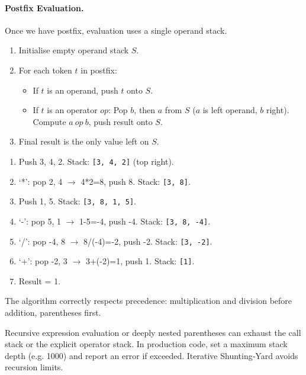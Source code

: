 \documentclass[11pt]{article}
\begin{document}
\paragraph{Postfix Evaluation.}
Once we have postfix, evaluation uses a single operand stack.

\begin{methode}
\begin{enumerate}
\item Initialise empty operand stack $S$.
\item For each token $t$ in postfix:
  \begin{itemize}
  \item If $t$ is an operand, push $t$ onto $S$.
  \item If $t$ is an operator $op$:
        Pop $b$, then $a$ from $S$ ($a$ is left operand, $b$ right).
        Compute $a\ op\ b$, push result onto $S$.
  \end{itemize}
\item Final result is the only value left on $S$.
\end{enumerate}
\end{methode}

\begin{exoresolu}
\begin{enumerate}
\item Push 3, 4, 2. Stack: \texttt{[3, 4, 2]} (top right).
\item `*': pop 2, 4 $\to$ 4*2=8, push 8. Stack: \texttt{[3, 8]}.
\item Push 1, 5. Stack: \texttt{[3, 8, 1, 5]}.
\item `-': pop 5, 1 $\to$ 1-5=-4, push -4. Stack: \texttt{[3, 8, -4]}.
\item `/': pop -4, 8 $\to$ 8/(-4)=-2, push -2. Stack: \texttt{[3, -2]}.
\item `+': pop -2, 3 $\to$ 3+(-2)=1, push 1. Stack: \texttt{[1]}.
\item Result = 1.
\end{enumerate}
\tcblower
The algorithm correctly respects precedence: multiplication and division before addition, parentheses first.
\end{exoresolu}

\begin{attention}
Recursive expression evaluation or deeply nested parentheses can exhaust the call stack or the explicit operator stack. In production code, set a maximum stack depth (e.g. 1000) and report an error if exceeded. Iterative Shunting‑Yard avoids recursion limits.
\end{attention}
\end{document}

